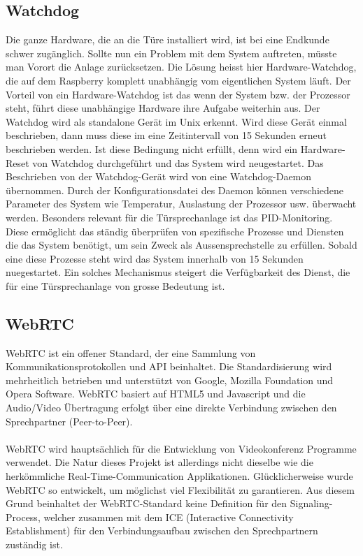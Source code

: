 \subsection{Watchdog}
\label{kap:watchdog}
Die ganze Hardware, die an die Türe installiert wird, ist bei eine Endkunde schwer zugänglich. Sollte nun ein Problem mit dem System auftreten, müsste man Vorort die Anlage zurücksetzen. Die Lösung heisst hier Hardware-Watchdog, die auf dem Raspberry komplett unabhängig vom eigentlichen System läuft. Der Vorteil von ein Hardware-Watchdog ist das wenn der System bzw. der Prozessor steht, führt diese unabhängige Hardware ihre Aufgabe weiterhin aus.
Der Watchdog wird als standalone Gerät im Unix erkennt. Wird diese Gerät einmal beschrieben, dann muss diese im eine Zeitintervall von 15 Sekunden erneut beschrieben werden. Ist diese Bedingung nicht erfüllt, denn wird ein Hardware-Reset von Watchdog durchgeführt und das System wird neugestartet.
Das Beschrieben von der Watchdog-Gerät wird von eine Watchdog-Daemon übernommen. 
Durch der Konfigurationsdatei des Daemon können verschiedene Parameter des System wie Temperatur, Auslastung der Prozessor usw. überwacht werden. Besonders relevant für die Türsprechanlage ist das PID-Monitoring. Diese ermöglicht das ständig überprüfen von spezifische Prozesse und Diensten die das System benötigt, um sein Zweck als Aussensprechstelle zu erfüllen. Sobald eine diese Prozesse steht wird das System innerhalb von 15 Sekunden nuegestartet. 
Ein solches Mechanismus steigert die Verfügbarkeit des Dienst, die für eine Türsprechanlage von grosse Bedeutung ist.

\subsection{WebRTC}
\label{kap:webrtc}
WebRTC ist ein offener Standard, der eine Sammlung von Kommunikationsprotokollen und API beinhaltet. Die Standardisierung wird mehrheitlich betrieben und unterstützt von Google, Mozilla Foundation und Opera Software. WebRTC basiert auf HTML5 und Javascript und die Audio/Video Übertragung erfolgt über eine direkte Verbindung zwischen den Sprechpartner (Peer-to-Peer).
\\
\\
WebRTC wird hauptsächlich für die Entwicklung von Videokonferenz Programme verwendet. Die Natur dieses Projekt ist allerdings nicht dieselbe wie die herkömmliche Real-Time-Communication Applikationen. Glücklicherweise wurde WebRTC so entwickelt, um möglichst viel Flexibilität zu garantieren. Aus diesem Grund beinhaltet der WebRTC-Standard keine Definition für den Signaling-Process, welcher zusammen mit dem ICE (Interactive Connectivity Establishment) für den Verbindungsaufbau zwischen den Sprechpartnern zuständig ist. 

